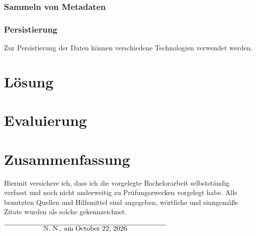 \documentclass[12pt,twoside,a4paper,parskip]{scrbook}
\def\BaAuthor{Lennard Rose, Jochen Schmidt, Moritz Zeitler}
\def\ShowBaAuthor{\BaAuthor}
\def\ShowBaAuthor{N.~N.}
\begin{document}
\subsection{Sammeln von Metadaten}

\subsection{Persistierung}
Zur Persistierung der Daten können verschiedene Technologien verwendet werden. 





\chapter{Lösung}

\chapter{Evaluierung}

\chapter{Zusammenfassung}


\backmatter

\listoffigures
{}

\listoftables


\cleardoublepage
{}
{}
\printbibliography



Hiermit versichere ich, dass ich die vorgelegte Bachelorarbeit selbstständig verfasst und noch nicht anderweitig zu Prüfungszwecken vorgelegt habe. Alle benutzten Quellen und Hilfsmittel sind angegeben, wörtliche und sinngemäße Zitate wurden als solche gekennzeichnet.

\vspace{20pt}
\begin{flushright}
$\overline{~~~~~~~~~~~~~~~~~\mbox{\ShowBaAuthor, am \today}~~~~~~~~~~~~~~~~~}$
\end{flushright}
\end{document}
